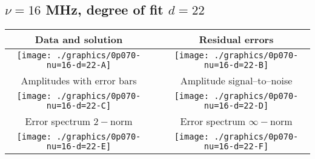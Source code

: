 

% 

\clearpage{}
\break{}

\subsection{$\nu = 16$ MHz, degree of fit $d = 22$}

\begin{table}[h]
    \begin{center}
        \begin{tabular}{ccc}
            Data and solution & \quad & Residual errors \\\hline
            \texttt{[image: ./graphics/0p070-nu=16-d=22-A]} &&
            \texttt{[image: ./graphics/0p070-nu=16-d=22-B]} \\[15pt]
            Amplitudes with error bars && Amplitude signal--to--noise \\\hline
            \texttt{[image: ./graphics/0p070-nu=16-d=22-C]} &&
            \texttt{[image: ./graphics/0p070-nu=16-d=22-D]} \\[15pt]
            Error spectrum $2-$norm && Error spectrum $\infty-$norm \\\hline
            \texttt{[image: ./graphics/0p070-nu=16-d=22-E]} &&
            \texttt{[image: ./graphics/0p070-nu=16-d=22-F]} \\[15pt]
        \end{tabular}
    \end{center}
\label{fig:elev=70, nu=16}
\end{table}



\endinput
